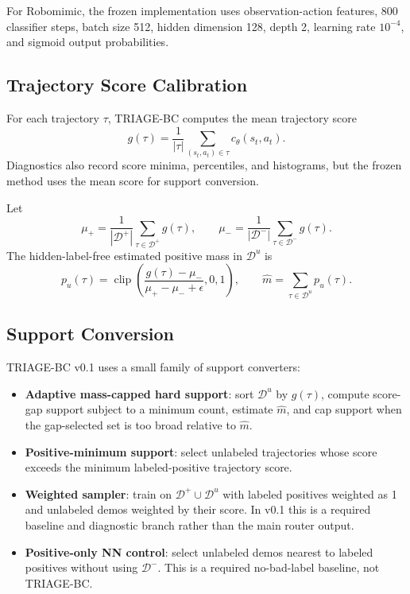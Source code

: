 \documentclass{article}
\newcommand{\Dpos}{\mathcal{D}^{+}}
\newcommand{\Dneg}{\mathcal{D}^{-}}
\newcommand{\Dunl}{\mathcal{D}^{u}}
\newcommand{\clip}{\operatorname{clip}}
\newcommand{\method}{TRIAGE-BC}
\begin{document}
For Robomimic, the frozen implementation uses observation-action features, 800 classifier steps, batch size 512, hidden dimension 128, depth 2, learning rate $10^{-4}$, and sigmoid output probabilities.

\subsection{Trajectory Score Calibration}

For each trajectory $\tau$, \method{} computes the mean trajectory score
\begin{equation}
  g(\tau) = \frac{1}{|\tau|}\sum_{(s_t,a_t)\in\tau} c_\theta(s_t,a_t).
\end{equation}
Diagnostics also record score minima, percentiles, and histograms, but the frozen method uses the mean score for support conversion.

Let
\begin{equation}
  \mu_+ = \frac{1}{|\Dpos|}\sum_{\tau\in\Dpos} g(\tau),
  \qquad
  \mu_- = \frac{1}{|\Dneg|}\sum_{\tau\in\Dneg} g(\tau).
\end{equation}
The hidden-label-free estimated positive mass in $\Dunl$ is
\begin{equation}
  p_u(\tau)
  =
  \clip\left(
    \frac{g(\tau)-\mu_-}{\mu_+-\mu_-+\epsilon},
    0, 1
  \right),
  \qquad
  \hat{m} = \sum_{\tau\in\Dunl} p_u(\tau).
\end{equation}

\subsection{Support Conversion}

\method{} v0.1 uses a small family of support converters:
\begin{itemize}[leftmargin=*]
  \item \textbf{Adaptive mass-capped hard support}: sort $\Dunl$ by $g(\tau)$, compute score-gap support subject to a minimum count, estimate $\hat{m}$, and cap support when the gap-selected set is too broad relative to $\hat{m}$.
  \item \textbf{Positive-minimum support}: select unlabeled trajectories whose score exceeds the minimum labeled-positive trajectory score.
  \item \textbf{Weighted sampler}: train on $\Dpos \cup \Dunl$ with labeled positives weighted as 1 and unlabeled demos weighted by their score. In v0.1 this is a required baseline and diagnostic branch rather than the main router output.
  \item \textbf{Positive-only NN control}: select unlabeled demos nearest to labeled positives without using $\Dneg$. This is a required no-bad-label baseline, not \method{}.
\end{itemize}
\end{document}
